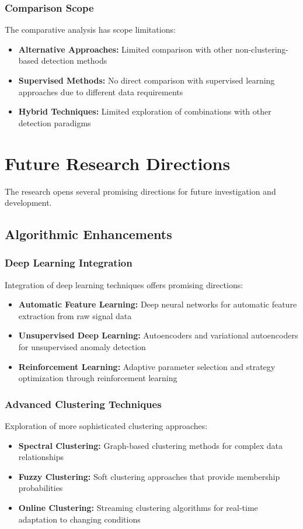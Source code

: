 \subsubsection{Comparison Scope}
The comparative analysis has scope limitations:
\begin{itemize}
\item \textbf{Alternative Approaches:} Limited comparison with other non-clustering-based detection methods
\item \textbf{Supervised Methods:} No direct comparison with supervised learning approaches due to different data requirements
\item \textbf{Hybrid Techniques:} Limited exploration of combinations with other detection paradigms
\end{itemize}

\section{Future Research Directions}
The research opens several promising directions for future investigation and development.

\subsection{Algorithmic Enhancements}

\subsubsection{Deep Learning Integration}
Integration of deep learning techniques offers promising directions:
\begin{itemize}
\item \textbf{Automatic Feature Learning:} Deep neural networks for automatic feature extraction from raw signal data
\item \textbf{Unsupervised Deep Learning:} Autoencoders and variational autoencoders for unsupervised anomaly detection
\item \textbf{Reinforcement Learning:} Adaptive parameter selection and strategy optimization through reinforcement learning
\end{itemize}

\subsubsection{Advanced Clustering Techniques}
Exploration of more sophisticated clustering approaches:
\begin{itemize}
\item \textbf{Spectral Clustering:} Graph-based clustering methods for complex data relationships
\item \textbf{Fuzzy Clustering:} Soft clustering approaches that provide membership probabilities
\item \textbf{Online Clustering:} Streaming clustering algorithms for real-time adaptation to changing conditions
\end{itemize}

